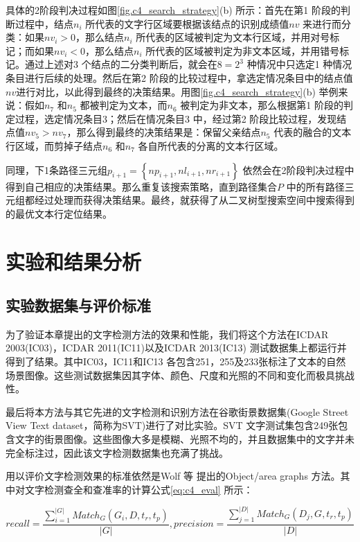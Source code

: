         具体的2阶段判决过程如图\ref{fig.c4_search_strategy}(b) 所示：首先在第1 阶段的判断过程中，结点$n_i$ 所代表的文字行区域要根据该结点的识别成绩值$nv$ 来进行而分类：如果$nv_i>0$，那么结点$n_i$ 所代表的区域被判定为文本行区域，并用对号标记；而如果$nv_i<0$，那么结点$n_i$ 所代表的区域被判定为非文本区域，并用错号标记。通过上述对3 个结点的二分类判断后，就会在$8=2^3$ 种情况中只选定1 种情况条目进行后续的处理。然后在第2 阶段的比较过程中，拿选定情况条目中的结点值$nv$进行对比，以此得到最终的决策结果。用图\ref{fig.c4_search_strategy}(b) 举例来说：假如$n_7$ 和$n_5$ 都被判定为文本，而$n_6$ 被判定为非文本，那么根据第1 阶段的判定过程，选定情况条目3；然后在情况条目3 中，经过第2 阶段比较过程，发现结点值$nv_5>nv_7$，那么得到最终的决策结果是：保留父亲结点$n_5$ 代表的融合的文本行区域，而剪掉子结点$n_6$ 和$n_7$ 各自所代表的分离的文本行区域。

        同理，下1条路径三元组$p_{i+1}=\left\{np_{i+1},nl_{i+1},nr_{i+1}\right\}$ 依然会在2阶段判决过程中得到自己相应的决策结果。那么重复该搜索策略，直到路径集合$P$ 中的所有路径三元组都经过处理而获得决策结果。最终，就获得了从二叉树型搜索空间中搜索得到的最优文本行定位结果。

    \section{实验和结果分析}

        \subsection{实验数据集与评价标准}

        为了验证本章提出的文字检测方法的效果和性能，我们将这个方法在ICDAR 2003(IC03)，ICDAR 2011(IC11)以及ICDAR 2013(IC13) 测试数据集上都运行并得到了结果。其中IC03，IC11和IC13 各包含251，255及233张标注了文本的自然场景图像。这些测试数据集因其字体、颜色、尺度和光照的不同和变化而极具挑战性。

        最后将本方法与其它先进的文字检测和识别方法在谷歌街景数据集(Google Street View Text dataset，简称为SVT)进行了对比实验。SVT 文字测试集包含249张包含文字的街景图像。这些图像大多是模糊、光照不均的，并且数据集中的文字并未完全标注过，因此该文字检测数据集也充满了挑战。

        用以评价文字检测效果的标准依然是Wolf 等\cite{Wolf2006Object} 提出的Object/area graphs 方法。其中对文字检测查全和查准率的计算公式\ref{eq:c4_eval} 所示：

        \begin{equation}
        recall = \frac {\sum_{i=1}^{|G|}Match_G(G_i,D,t_r,t_p)} {|G|}  ,
        precision =\frac {\sum_{j=1}^{|D|}Match_G(D_j,G,t_r,t_p)} {|D|}
        \label{eq:c4_eval}
        \end{equation}


